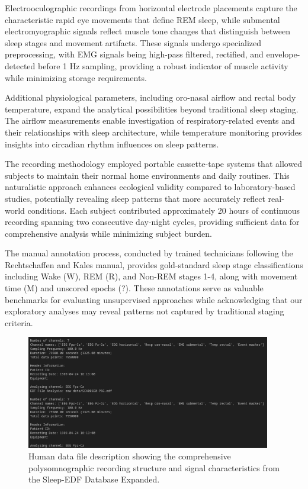 \documentclass[a4paper,12pt,twoside]{article}
\begin{document}
Electrooculographic recordings from horizontal electrode placements capture the characteristic rapid eye movements that define REM sleep, while submental electromyographic signals reflect muscle tone changes that distinguish between sleep stages and movement artifacts. These signals undergo specialized preprocessing, with EMG signals being high-pass filtered, rectified, and envelope-detected before 1 Hz sampling, providing a robust indicator of muscle activity while minimizing storage requirements.

Additional physiological parameters, including oro-nasal airflow and rectal body temperature, expand the analytical possibilities beyond traditional sleep staging. The airflow measurements enable investigation of respiratory-related events and their relationships with sleep architecture, while temperature monitoring provides insights into circadian rhythm influences on sleep patterns.

The recording methodology employed portable cassette-tape systems that allowed subjects to maintain their normal home environments and daily routines. This naturalistic approach enhances ecological validity compared to laboratory-based studies, potentially revealing sleep patterns that more accurately reflect real-world conditions. Each subject contributed approximately 20 hours of continuous recording spanning two consecutive day-night cycles, providing sufficient data for comprehensive analysis while minimizing subject burden.

The manual annotation process, conducted by trained technicians following the Rechtschaffen and Kales manual, provides gold-standard sleep stage classifications including Wake (W), REM (R), and Non-REM stages 1-4, along with movement time (M) and unscored epochs (?). These annotations serve as valuable benchmarks for evaluating unsupervised approaches while acknowledging that our exploratory analyses may reveal patterns not captured by traditional staging criteria.

\begin{figure}
    \centering
    \includegraphics[width=0.95\textwidth]{img/data description.png}
    \caption{Human data file description showing the comprehensive polysomnographic recording structure and signal characteristics from the Sleep-EDF Database Expanded.}
    \label{fig:human_data_description}
\end{figure}
\end{document}
